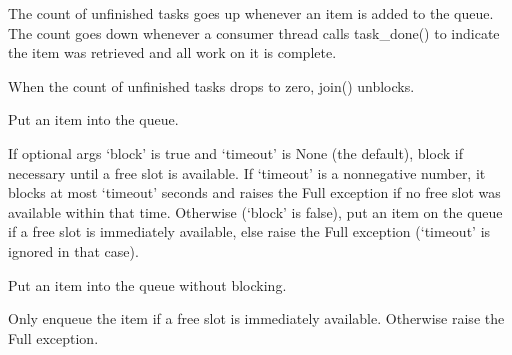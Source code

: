 \documentclass[letterpaper,10pt,english]{sphinxmanual}
\begin{document}
\begin{fulllineitems}
\begin{fulllineitems}
\sphinxAtStartPar
The count of unfinished tasks goes up whenever an item is added to the
queue. The count goes down whenever a consumer thread calls task\_done()
to indicate the item was retrieved and all work on it is complete.

\sphinxAtStartPar
When the count of unfinished tasks drops to zero, join() unblocks.

\end{fulllineitems}


\begin{fulllineitems}
\label{\detokenize{modules/src.model_training.trainer:src.model_training.trainer.Queue.put}}
\pysigstartsignatures
\pysiglinewithargsret
{}
{\sphinxparamcomma {}\sphinxparamcomma {}}
{}
\pysigstopsignatures
\sphinxAtStartPar
Put an item into the queue.

\sphinxAtStartPar
If optional args ‘block’ is true and ‘timeout’ is None (the default),
block if necessary until a free slot is available. If ‘timeout’ is
a non\sphinxhyphen{}negative number, it blocks at most ‘timeout’ seconds and raises
the Full exception if no free slot was available within that time.
Otherwise (‘block’ is false), put an item on the queue if a free slot
is immediately available, else raise the Full exception (‘timeout’
is ignored in that case).

\end{fulllineitems}


\begin{fulllineitems}
\label{\detokenize{modules/src.model_training.trainer:src.model_training.trainer.Queue.put_nowait}}
\pysigstartsignatures
\pysiglinewithargsret
{}
{}
{}
\pysigstopsignatures
\sphinxAtStartPar
Put an item into the queue without blocking.

\sphinxAtStartPar
Only enqueue the item if a free slot is immediately available.
Otherwise raise the Full exception.


\end{fulllineitems}
\end{fulllineitems}
\end{document}

